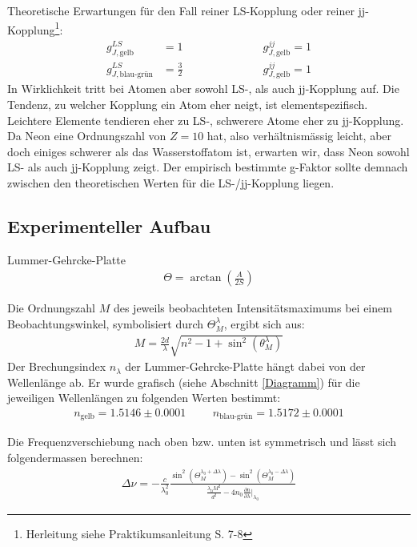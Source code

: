 \documentclass[12pt,a4paper]{article} %
\begin{document}
Theoretische Erwartungen für den Fall reiner LS-Kopplung oder reiner jj-Kopplung\footnote{Herleitung siehe Praktikumsanleitung S. 7-8}:
\begin{align}
g_{J,\text{gelb}}^{LS} &= 1 \hspace{3cm} g_{J,\text{gelb}}^{jj} = 1 \\
g_{J,\text{blau-grün}}^{LS} &= \frac{3}{2} \hspace{3cm} g_{J,\text{gelb}}^{jj} = 1
\end{align}
In Wirklichkeit tritt bei Atomen aber sowohl LS-, als auch jj-Kopplung auf. Die Tendenz, zu welcher Kopplung ein Atom eher neigt, ist elementspezifisch. Leichtere Elemente tendieren eher zu LS-, schwerere Atome eher zu jj-Kopplung. Da Neon eine Ordnungszahl von $Z=10$ hat, also verhältnismässig leicht, aber doch einiges schwerer als das Wasserstoffatom ist, erwarten wir, dass Neon sowohl LS- als auch jj-Kopplung zeigt. Der empirisch bestimmte g-Faktor sollte demnach zwischen den theoretischen Werten für die LS-/jj-Kopplung liegen.


\subsection{Experimenteller Aufbau}
Lummer-Gehrcke-Platte
\begin{align}
\Theta = \arctan\left(\frac{A}{2S}\right)
\end{align}

Die Ordnungszahl $M$ des jeweils beobachteten Intensitätsmaximums bei einem Beobachtungswinkel, symbolisiert durch $\Theta_M^{\lambda}$, ergibt sich aus:
\begin{align}
M = \frac{2d}{\lambda} \sqrt{n^2-1+\sin^2(\theta_M^{\lambda})}
\end{align}
Der Brechungsindex $n_{\lambda}$ der Lummer-Gehrcke-Platte hängt dabei von der Wellenlänge ab. Er wurde grafisch (siehe Abschnitt \ref{Diagramm}) für die jeweiligen Wellenlängen zu folgenden Werten bestimmt:
\begin{align}
n_{\text{gelb}} = 1.5146 \pm 0.0001 \hspace{1cm} n_{\text{blau-grün}} = 1.5172 \pm 0.0001 \label{n}
\end{align}


Die Frequenzverschiebung nach oben bzw. unten ist symmetrisch und lässt sich folgendermassen berechnen:
\begin{align}
\Delta\nu = -\frac{c}{\lambda_0^2}\frac{\sin^2(\Theta_M^{\lambda_0+\Delta\lambda})-\sin^2(\Theta_M^{\lambda_0-\Delta\lambda})}{\frac{\lambda_0 M^2}{d^2} -4n_0 \frac{\partial n}{\partial \lambda}\bigg\vert_{\lambda_0}}
\end{align}
\end{document}

